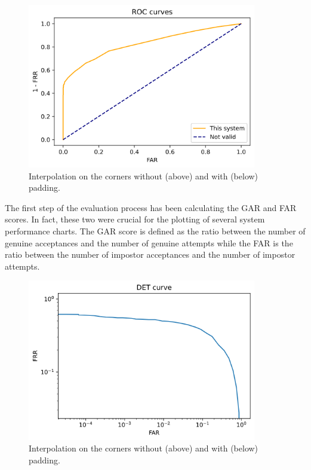 \documentclass{article}
\begin{document}
\begin{figure}[H]
    \label{fig:roc}
    \begin{center}
        \includegraphics[width=10cm,keepaspectratio]{images/roc.png}
        \caption{Interpolation on the corners without (above) and with (below) padding.}
    \end{center}
\end{figure}

The first step of the evaluation process has been calculating the GAR and FAR scores. 
In fact, these two were crucial for the plotting of several system performance charts. 
The GAR score is defined as the ratio between the number of genuine acceptances and the 
number of genuine attempts while the FAR is the ratio between the number of impostor 
acceptances and the number of impostor attempts.\\

\begin{figure}[H]
    \label{fig:det}
    \begin{center}
        \includegraphics[width=10cm,keepaspectratio]{images/det.png}
        \caption{Interpolation on the corners without (above) and with (below) padding.}
    \end{center}
\end{figure}
\end{document}
